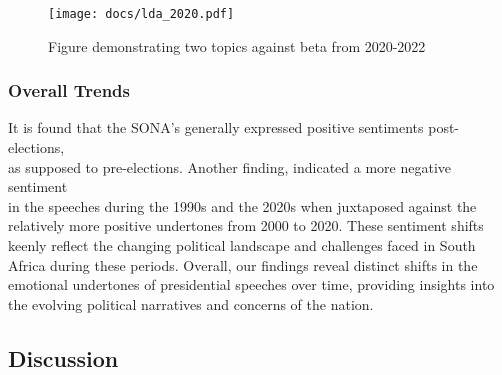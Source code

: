 \documentclass[
  letterpaper,
  DIV=11,
  numbers=noendperiod]{scrartcl}
\begin{document}
\begin{figure}

{\centering \texttt{[image: docs/lda\_2020.pdf]}

}

\caption{Figure demonstrating two topics against beta from 2020-2022}

\end{figure}

\hypertarget{overall-trends}{%
\subsubsection{Overall Trends}\label{overall-trends}}

It is found that the SONA's generally expressed positive sentiments
post-elections,\\
as supposed to pre-elections. Another finding, indicated a more negative
sentiment\\
in the speeches during the 1990s and the 2020s when juxtaposed against
the relatively more positive undertones from 2000 to 2020. These
sentiment shifts keenly reflect the changing political landscape and
challenges faced in South Africa during these periods. Overall, our
findings reveal distinct shifts in the emotional undertones of
presidential speeches over time, providing insights into the evolving
political narratives and concerns of the nation.

\hypertarget{discussion}{%
\subsection{Discussion}\label{discussion}}
\end{document}
